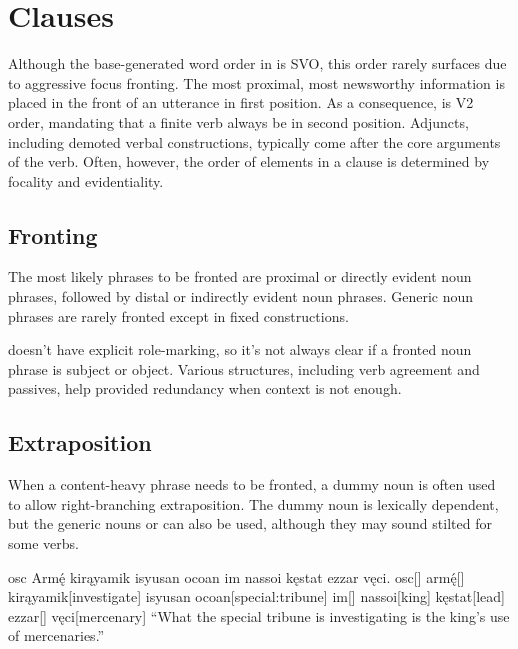 \setchapterpreamble[u]{\margintoc}
\chapter{Clauses}
Although the base-generated word order in \langname{} is SVO, this order rarely surfaces due to aggressive focus fronting. The most proximal, most newsworthy information is placed in the front of an utterance in first position. As a consequence, \langname{} is V2 order, mandating that a finite verb always be in second position. Adjuncts, including demoted verbal constructions, typically come after the core arguments of the verb.  Often, however, the order of elements in a clause is determined by focality and evidentiality.

\section{Fronting}
The most likely phrases to be fronted are proximal or directly evident noun phrases, followed by distal or indirectly evident noun phrases. Generic noun phrases are rarely fronted except in fixed constructions.

\langname{} doesn't have explicit role-marking, so it's not always clear if a fronted noun phrase is subject or object. Various structures, including verb agreement and passives, help provided redundancy when context is not enough.

\section{Extraposition}
When a content-heavy phrase needs to be fronted, a dummy noun is often used to allow right-branching extraposition. The dummy noun is lexically dependent, but the generic nouns  or  can also be used, although they may sound stilted for some verbs.

\begin{gloss*}
    \begingl
        \glpreamble osc Armę́ kirąyamik isyusan ocoan im nassoi kęstat ezzar vęci. \endpreamble
            osc[]
            armę́[]
            kirąyamik[investigate]
            {isyusan ocoan}[special:tribune]
            im[]
            nassoi[king]
            kęstat[lead]
            ezzar[]
            vęci[mercenary]
        \glft “What the special tribune is investigating is the king's use of mercenaries.”
    \endgl
\end{gloss*}

